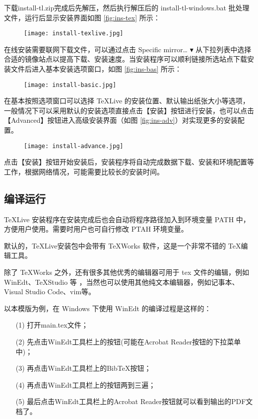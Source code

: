 下载install-tl.zip完成后先解压，然后执行解压后的 install-tl-windows.bat 批处理文件，运行后显示安装界面如图 \ref{fig:ins-tex} 所示：

\begin{figure}[htbp]
  \centering
  \texttt{[image: install-texlive.jpg]}
\end{figure}

在线安装需要联网下载文件，可以通过点击 Specific mirror… $\blacktriangledown$ 从下拉列表中选择合适的镜像站点以提高下载、安装速度。当安装程序可以顺利链接所选站点下载安装文件后进入基本安装选项窗口，如图 \ref{fig:ins-bas} 所示：

\begin{figure}[htbp]
  \centering
  \texttt{[image: install-basic.jpg]}
\end{figure}

在基本按照选项窗口可以选择 \TeX{}Live 的安装位置、默认输出纸张大小等选项，一般情况下可以采用默认的安装选项直接点击【安装】按钮进行安装，也可以点击【Advanced】按钮进入高级安装界面（如图 \ref{fig:ins-adv}）对实现更多的安装配置。

\begin{figure}[htbp]
  \centering
  \texttt{[image: install-advance.jpg]}
\end{figure}

点击【安装】按钮开始安装后，安装程序将自动完成数据下载、安装和环境配置等工作，根据网络情况，可能需要比较长的安装时间。

\subsection{编译运行}
\TeX{}Live 安装程序在安装完成后也会自动将程序路径加入到环境变量 PATH 中，方便用户使用。需要时用户也可自行修改 PTAH 环境变量。


默认的，\TeX{}Live安装包中会带有 TeXWorks 软件，这是一个非常不错的 \TeX{}编辑工具。

除了 TeXWorks 之外，还有很多其他优秀的编辑器可用于 tex 文件的编辑，例如 WinEdt、TeXStudio 等 ，当然也可以使用其他纯文本编辑器，例如记事本、Visual Studio Code、vim等。

以本模版为例，在 Windows 下使用 WinEdt 的编译过程是这样的：
\begin{enumerate}
  \item[(1)] 打开main.tex文件；
  \item[(2)] 先点击WinEdt工具栏上的\XeLaTeX{}按钮(可能在Acrobat Reader按钮的下拉菜单中)；
  \item[(3)] 再点击WinEdt工具栏上的Bib\TeX{}按钮；
  \item[(4)] 再点击WinEdt工具栏上的\XeLaTeX{}按钮两到三遍；
  \item[(5)] 最后点击WinEdt工具栏上的Acrobat Reader按钮就可以看到输出的PDF文档了。
\end{enumerate}


